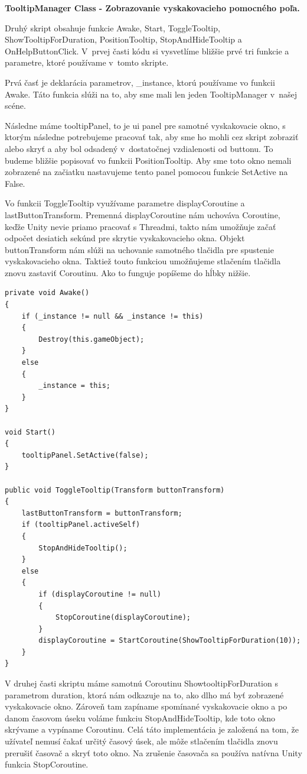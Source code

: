 {\normalsize\textbf{TooltipManager Class - Zobrazovanie vyskakovacieho pomocného poľa.}}

Druhý skript obsahuje funkcie Awake, Start, ToggleTooltip, ShowTooltipForDuration, PositionTooltip, StopAndHideTooltip a OnHelpButtonClick. V~prvej časti kódu si vysvetlíme bližšie prvé tri funkcie a parametre, ktoré používame v~tomto skripte. 

Prvá časť je deklarácia parametrov, \_instance, ktorú používame vo funkcii Awake. Táto funkcia slúži na to, aby sme mali len jeden TooltipManager v~našej scéne. 

Následne máme tooltipPanel, to je \gls{ui} panel pre samotné vyskakovacie okno, s ktorým následne potrebujeme pracovať tak, aby sme ho mohli cez skript zobraziť alebo skryť a aby bol odsadený v~dostatočnej vzdialenosti od buttonu. To budeme bližšie popisovať vo funkcii PositionTooltip. Aby sme toto okno nemali zobrazené na začiatku nastavujeme tento panel pomocou funkcie SetActive na False.

Vo funkcii ToggleTooltip využívame parametre displayCoroutine a lastButtonTransform. Premenná displayCoroutine nám uchováva Coroutine, keďže Unity nevie priamo pracovať s Threadmi, takto nám umožňuje začať odpočet desiatich sekúnd pre skrytie vyskakovacieho okna. Objekt buttonTransform nám slúži na uchovanie samotného tlačidla pre spustenie vyskakovacieho okna. Taktiež touto funkciou umožňujeme stlačením tlačidla znovu zastaviť Coroutinu. Ako to funguje popíšeme do hĺbky nižšie.

\lstset{style=Csharp}
\begin{lstlisting}[caption={TooltipManager Class - Zobrazovanie vyskakovacieho pomocného poľa. Part 1}, label=tooltipManagerPart1]
private void Awake()
{
    if (_instance != null && _instance != this)
    {
        Destroy(this.gameObject);
    }
    else
    {
        _instance = this;
    }
}

void Start()
{
    tooltipPanel.SetActive(false);
}

public void ToggleTooltip(Transform buttonTransform)
{
    lastButtonTransform = buttonTransform; 
    if (tooltipPanel.activeSelf)
    {
        StopAndHideTooltip(); 
    }
    else
    {
        if (displayCoroutine != null)
        {
            StopCoroutine(displayCoroutine); 
        }
        displayCoroutine = StartCoroutine(ShowTooltipForDuration(10));
    }
}
\end{lstlisting}

V druhej časti skriptu máme samotnú Coroutinu ShowtooltipForDuration s parametrom duration, ktorá nám odkazuje na to, ako dlho má byť zobrazené vyskakovacie okno. Zároveň tam zapíname spomínané vyskakovacie okno a po danom časovom úseku voláme funkciu StopAndHideTooltip, kde toto okno skrývame a vypíname Coroutinu. Celá táto implementácia je založená na tom, že užívateľ nemusí čakať určitý časový úsek, ale môže stlačením tlačidla znovu prerušiť časovač a skryť toto okno. Na zrušenie časovača sa používa natívna Unity funkcia StopCoroutine.

